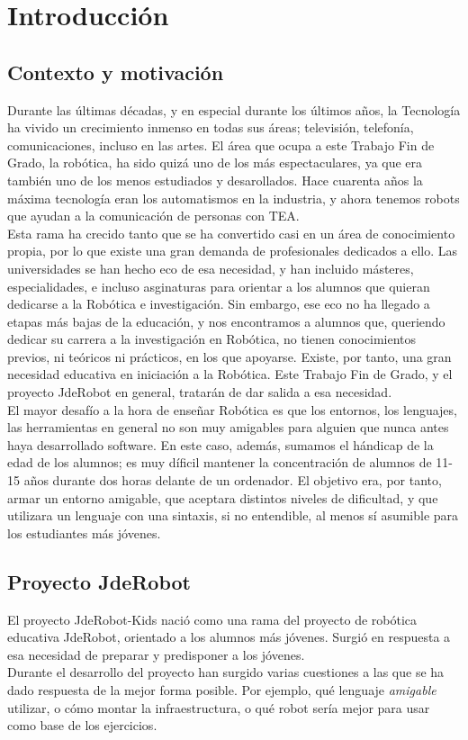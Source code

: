 \chapter{Introducción}
\label{cap:introduccion}

\section{Contexto y motivación}
Durante las últimas décadas, y en especial durante los últimos años, la Tecnología ha vivido un crecimiento inmenso en todas sus áreas; televisión, telefonía, comunicaciones, incluso en las artes. El área que ocupa a este Trabajo Fin de Grado, la robótica, ha sido quizá uno de los más espectaculares, ya que era también uno de los menos estudiados y desarollados. Hace cuarenta años la máxima tecnología eran los automatismos en la industria, y ahora tenemos robots que ayudan a la comunicación de personas con TEA.\\
Esta rama ha crecido tanto que se ha convertido casi en un área de conocimiento propia, por lo que existe una gran demanda de profesionales dedicados a ello. Las universidades se han hecho eco de esa necesidad, y han incluido másteres, especialidades, e incluso asginaturas para orientar a los alumnos que quieran dedicarse a la Robótica e investigación. Sin embargo, ese eco no ha llegado a etapas más bajas de la educación, y nos encontramos a alumnos que, queriendo dedicar su carrera a la investigación en Robótica, no tienen conocimientos previos, ni teóricos ni prácticos, en los que apoyarse. Existe, por tanto, una gran necesidad educativa en iniciación a la Robótica. Este Trabajo Fin de Grado, y el proyecto JdeRobot en general, tratarán de dar salida a esa necesidad. \\
El mayor desafío a la hora de enseñar Robótica es que los entornos, los lenguajes, las herramientas en general no son muy amigables para alguien que nunca antes haya desarrollado software. En este caso, además, sumamos el hándicap de la edad de los alumnos; es muy díficil mantener la concentración de alumnos de 11-15 años durante dos horas delante de un ordenador. El objetivo era, por tanto, armar un entorno amigable, que aceptara distintos niveles de dificultad, y que utilizara un lenguaje con una sintaxis, si no entendible, al menos sí asumible para los estudiantes más jóvenes. 
\section{Proyecto JdeRobot}
El proyecto JdeRobot-Kids nació como una rama del proyecto de robótica educativa JdeRobot, orientado a los alumnos más jóvenes. Surgió en respuesta a esa necesidad de preparar y predisponer a los jóvenes. \\
Durante el desarrollo del proyecto han surgido varias cuestiones a las que se ha dado respuesta de la mejor forma posible. Por ejemplo, qué lenguaje \textit{amigable} utilizar, o cómo montar la infraestructura, o qué robot sería mejor para usar como base de los ejercicios. 
